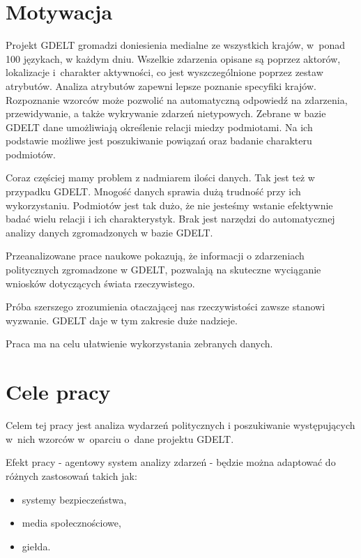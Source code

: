 \documentclass[11pt]{report}
\begin{document}
    \section{Motywacja}\label{sec:motywacja}
    Projekt GDELT gromadzi doniesienia medialne ze wszystkich krajów, w~ponad 100 językach, w każdym dniu.
    Wszelkie zdarzenia opisane są poprzez aktorów, lokalizacje i~charakter aktywności, co jest wyszczególnione poprzez zestaw atrybutów.
    Analiza atrybutów zapewni lepsze poznanie specyfiki krajów.
    Rozpoznanie wzorców może pozwolić na automatyczną odpowiedź na zdarzenia, przewidywanie, a także wykrywanie zdarzeń nietypowych.
    Zebrane w bazie GDELT dane umożliwiają określenie relacji miedzy podmiotami.
    Na ich podstawie możliwe jest poszukiwanie powiązań oraz badanie charakteru podmiotów.

    Coraz częściej mamy problem z nadmiarem ilości danych.
    Tak jest też w przypadku GDELT\@.
    Mnogość danych sprawia dużą trudność przy ich wykorzystaniu.
    Podmiotów jest tak dużo, że nie jesteśmy wstanie efektywnie badać wielu relacji i ich charakterystyk.
    Brak jest narzędzi do automatycznej analizy danych zgromadzonych w bazie GDELT\@.

    Przeanalizowane prace naukowe pokazują, że informacji o zdarzeniach politycznych zgromadzone w GDELT,
    pozwalają na skuteczne wyciąganie wniosków dotyczących świata rzeczywistego.

    Próba szerszego zrozumienia otaczającej nas rzeczywistości zawsze stanowi wyzwanie.
    GDELT daje w tym zakresie duże nadzieje.

    Praca ma na celu ułatwienie wykorzystania zebranych danych.


    \section{Cele pracy}\label{sec:cele-pracy}
    Celem tej pracy jest analiza wydarzeń politycznych i poszukiwanie występujących w~nich wzorców w~oparciu o~dane projektu GDELT.\@

    Efekt pracy - agentowy system analizy zdarzeń - będzie można adaptować do różnych zastosowań takich jak:
    \begin{itemize}
        \item systemy bezpieczeństwa,
        \item media społecznościowe,
        \item giełda.
    \end{itemize}
\end{document}
